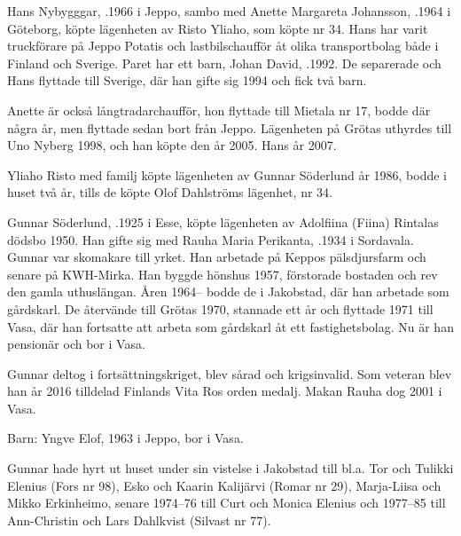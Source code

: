 %
Hans Nybygggar, .1966 i Jeppo, sambo med Anette Margareta Johansson, .1964 i Göteborg, köpte lägenheten av Risto Yliaho, som köpte nr 34. Hans har varit truckförare på Jeppo Potatis och lastbilschaufför åt olika transportbolag både i Finland och Sverige. Paret har ett barn, Johan David, .1992. De separerade och Hans flyttade till Sverige, där han gifte sig 1994 och fick två barn.

Anette är också långtradarchaufför, hon flyttade till Mietala nr 17, bodde där några år, men flyttade sedan bort från Jeppo. Lägenheten på Grötas uthyrdes till Uno Nyberg 1998, och han köpte den år 2005.
Hans \textdied år 2007.


%
Yliaho Risto med familj köpte lägenheten av Gunnar Söderlund år 1986, bodde i huset två år, tills de köpte Olof Dahlströms lägenhet, nr 34.\jhvspace{}


%
Gunnar Söderlund, .1925 i Esse, köpte lägenheten av Adolfiina (Fiina) Rintalas dödsbo 1950. Han gifte sig med Rauha Maria Perikanta, .1934 i Sordavala. Gunnar var skomakare till yrket. Han arbetade på Keppos pälsdjursfarm och senare på KWH-Mirka. Han byggde hönshus 1957, förstorade bostaden och rev den gamla uthuslängan. Åren 1964-- bodde de i Jakobstad, där han arbetade som gårdskarl. De återvände till Grötas 1970, stannade ett år och flyttade 1971 till Vasa, där han fortsatte  att arbeta som  gårdskarl åt ett fastighetsbolag. Nu är han pensionär och bor i Vasa.

Gunnar deltog i fortsättningskriget, blev sårad och krigsinvalid. Som veteran blev han år 2016 tilldelad Finlands Vita Ros orden medalj. Makan Rauha dog 2001 i Vasa.

Barn: Yngve Elof,  1963 i Jeppo, bor i Vasa.

Gunnar hade hyrt ut huset under sin vistelse i Jakobstad till bl.a. Tor och Tulikki Elenius (Fors nr 98), Esko och Kaarin Kalijärvi (Romar nr 29), Marja-Liisa och Mikko Erkinheimo, senare 1974--76 till Curt och Monica Elenius och 1977--85 till Ann-Christin och Lars Dahlkvist (Silvast nr 77).


